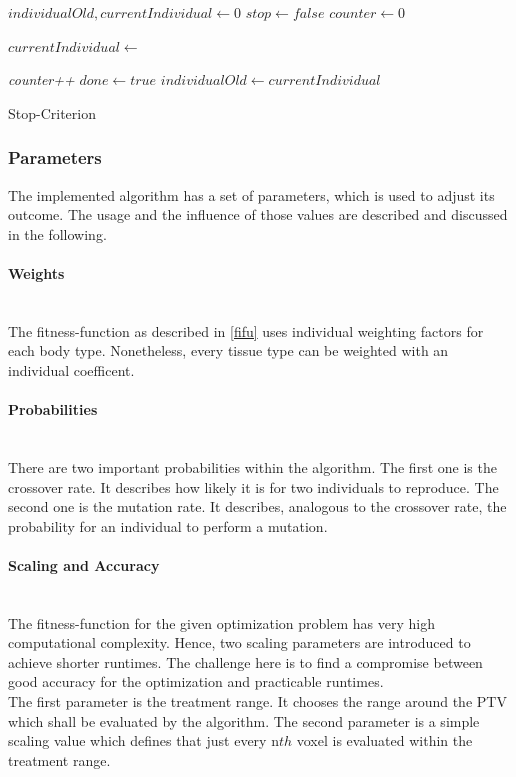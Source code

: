\documentclass[12pt]{article}
\begin{document}
\begin{algorithm}[H]
$individualOld,currentIndividual \leftarrow 0$\;
$stop \leftarrow false$\;
$counter \leftarrow 0$\;
 {
 	
	$currentIndividual \leftarrow $\iter{}\;
	
	 {
		\emph{counter++}
	} 
	 {
		$done \leftarrow true$
	}  
	$individualOld \leftarrow currentIndividual $
	
	
	
	
	}
	 

\caption{Stop-Criterion}
\end{algorithm}  

\newpage
\subsubsection{Parameters}
The implemented algorithm has a set of parameters, which is used to adjust its outcome. The usage and the influence of those values are described and discussed in the following.

\paragraph{Weights}~\\
The fitness-function as described in \ref{fifu} uses individual weighting factors for each body type.  Nonetheless, every tissue type can be weighted with an individual coefficent. 

\paragraph{Probabilities} ~\\ 
There are two important probabilities within the algorithm. The first one is the crossover rate. It describes how likely it is for two individuals to reproduce. The second one is the mutation rate. It describes, analogous to the crossover rate, the probability for an individual to perform a mutation. 

\paragraph{Scaling and Accuracy}~\\
The fitness-function for the given optimization problem has very high computational complexity. Hence, two scaling parameters are introduced to achieve shorter runtimes. The challenge here is to find a compromise between good accuracy for the optimization and practicable runtimes.\\ The first parameter is the treatment range. It chooses the range around the PTV which shall be evaluated by the algorithm. The second parameter is a simple scaling value which defines that just every  n$th$ voxel is evaluated within the treatment range.
\end{document}
